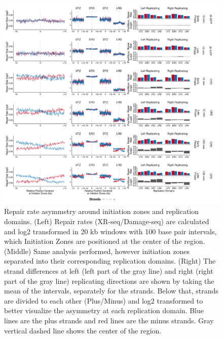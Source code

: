 \begin{figure}[H]
    \begin{center}
    \includegraphics[width=\textwidth]{Chapters/4_results/figures/fig6}
    \caption[Repair rate asymmetry around initiation zones and replication domains.]{Repair rate asymmetry around initiation zones and replication domains. (Left) Repair rates (XR-seq/Damage-seq) are calculated and log2 transformed in 20 kb windows with 100 base pair intervals, which Initiation Zones are positioned at the center of the region. (Middle) Same analysis performed, however initiation zones separated into their corresponding replication domains. (Right) The strand differences at left (left part of the gray line) and right (right part of the gray line) replicating directions are shown by taking the mean of the intervals, separately for the strands. Below that, strands are divided to each other (Plus/Minus) and log2 transformed to better visualize the asymmetry at each replication domain. Blue lines are the plus strands and red lines are the minus strands. Gray vertical dashed line shows the center of the region.}
    \label{fig:repairrate}
    \end{center}
    \end{figure}

                                                                   
